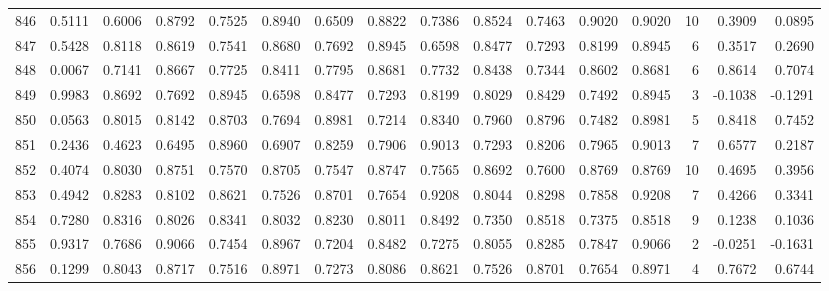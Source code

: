 \begin{tabular}{lrrrrrrrrrrrrrrr}
846 &      0.5111 &  0.6006 &  0.8792 &  0.7525 &  0.8940 &  0.6509 &  0.8822 &  0.7386 &  0.8524 &  0.7463 &   0.9020 &     0.9020 &     10 &                    0.3909 &                     0.0895 \\
847 &      0.5428 &  0.8118 &  0.8619 &  0.7541 &  0.8680 &  0.7692 &  0.8945 &  0.6598 &  0.8477 &  0.7293 &   0.8199 &     0.8945 &      6 &                    0.3517 &                     0.2690 \\
848 &      0.0067 &  0.7141 &  0.8667 &  0.7725 &  0.8411 &  0.7795 &  0.8681 &  0.7732 &  0.8438 &  0.7344 &   0.8602 &     0.8681 &      6 &                    0.8614 &                     0.7074 \\
849 &      0.9983 &  0.8692 &  0.7692 &  0.8945 &  0.6598 &  0.8477 &  0.7293 &  0.8199 &  0.8029 &  0.8429 &   0.7492 &     0.8945 &      3 &                   -0.1038 &                    -0.1291 \\
850 &      0.0563 &  0.8015 &  0.8142 &  0.8703 &  0.7694 &  0.8981 &  0.7214 &  0.8340 &  0.7960 &  0.8796 &   0.7482 &     0.8981 &      5 &                    0.8418 &                     0.7452 \\
851 &      0.2436 &  0.4623 &  0.6495 &  0.8960 &  0.6907 &  0.8259 &  0.7906 &  0.9013 &  0.7293 &  0.8206 &   0.7965 &     0.9013 &      7 &                    0.6577 &                     0.2187 \\
852 &      0.4074 &  0.8030 &  0.8751 &  0.7570 &  0.8705 &  0.7547 &  0.8747 &  0.7565 &  0.8692 &  0.7600 &   0.8769 &     0.8769 &     10 &                    0.4695 &                     0.3956 \\
853 &      0.4942 &  0.8283 &  0.8102 &  0.8621 &  0.7526 &  0.8701 &  0.7654 &  0.9208 &  0.8044 &  0.8298 &   0.7858 &     0.9208 &      7 &                    0.4266 &                     0.3341 \\
854 &      0.7280 &  0.8316 &  0.8026 &  0.8341 &  0.8032 &  0.8230 &  0.8011 &  0.8492 &  0.7350 &  0.8518 &   0.7375 &     0.8518 &      9 &                    0.1238 &                     0.1036 \\
855 &      0.9317 &  0.7686 &  0.9066 &  0.7454 &  0.8967 &  0.7204 &  0.8482 &  0.7275 &  0.8055 &  0.8285 &   0.7847 &     0.9066 &      2 &                   -0.0251 &                    -0.1631 \\
856 &      0.1299 &  0.8043 &  0.8717 &  0.7516 &  0.8971 &  0.7273 &  0.8086 &  0.8621 &  0.7526 &  0.8701 &   0.7654 &     0.8971 &      4 &                    0.7672 &                     0.6744 \\

\end{tabular}
